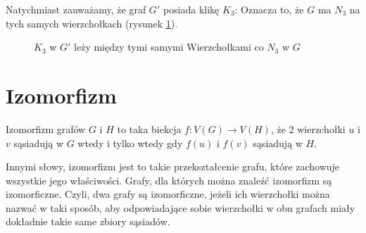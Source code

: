      Natychmiast zauważamy, że graf $G'$ posiada klikę $K_3$:
    Oznacza to, że $G$ ma $N_3$ na tych samych wierzchołkach (rysunek \ref{dopwiesz}).

    \begin{figure}[H]
      \centering
{}
        \hspace{15mm}
        \caption{ $K_3$ w $G'$ leży między tymi samymi Wierzchołkami co $N_3$ w $G$ }
        \label{dopwiesz}
     \end{figure}




  \section{Izomorfizm}

  \begin{definition}
    Izomorfizm grafów $G$ i $H$ to taka biekcja $f:V(G) \to V(H)$, że 2 wierzchołki $u$ i $v$ sąsiadują w $G$ wtedy i tylko wtedy gdy $f(u)$ i $f(v)$ sąsiadują w $H$.
  \end{definition}

  Innymi słowy, izomorfizm jest to takie przekształcenie grafu, które zachowuje wszystkie jego właściwości. Grafy, dla których można znaleźć izomorfizm są izomorficzne\cite{graphtheory}. Czyli, dwa grafy są izomorficzne, jeżeli ich wierzchołki można nazwać w taki sposób, 
  aby odpowiadające sobie wierzchołki w obu grafach miały dokładnie takie same zbiory sąsiadów.
  

